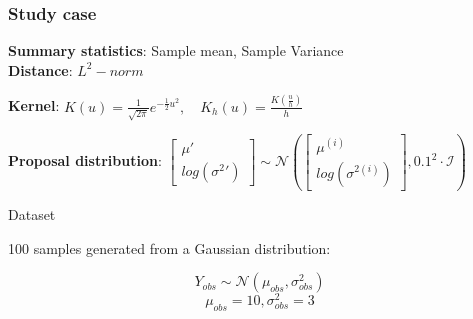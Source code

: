 \documentclass{beamer}
\begin{document}
\begin{frame}
{\begin{itemize}
			\end{itemize}
			
		

	}

\end{frame}

	
	\begin{frame}
		\frametitle{Study case}
		
		\textbf{Summary statistics}: Sample mean, Sample Variance \\
	
	
		\textbf{Distance}: $L^2-norm$
		
		\textbf{Kernel}: $
		K(u) = 
		\frac{1}{\sqrt{2\pi}} e^{-\frac{1}{2}u^2}, 
		\quad K_h(u) 
		= \frac{K(\frac{u}{h})}{h}
		$
%		

		\textbf{Proposal distribution}:	$	 \begin{bmatrix}    %
		\mu' \\ log(\sigma^2')	\end{bmatrix} 
	\sim \mathcal{N}\left( \begin{bmatrix}    %
		\mu^{(i)} \\ log(\sigma^{2(i)})
	\end{bmatrix}, 0.1^2\cdot\mathcal{I}\right)$
	
	\pause
	
		
		\begin{block}{Dataset}
		
			100 samples generated from a Gaussian distribution:
			
				$$ Y_{obs} \sim \mathcal{N}(\mu_{obs}, \sigma_{obs}^{2}) $$
				$$	\mu_{obs} = 10,	\sigma_{obs}^{2} = 3	$$
		
		\end{block}
		
	\end{frame}
	
\end{document}
